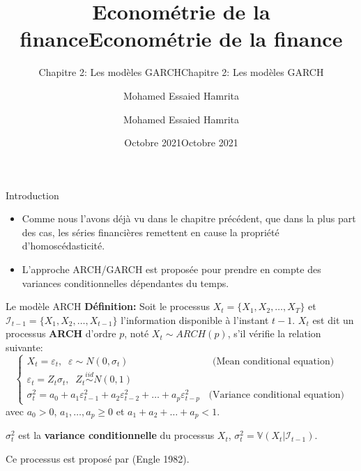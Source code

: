 \documentclass[
  ignorenonframetext,
]{beamer}
\title{Econométrie de la finance}
\subtitle{Chapitre 2: Les modèles GARCH}
\author{Mohamed Essaied Hamrita}
\date{Octobre 2021}
\title{Econométrie de la finance}
\subtitle{Chapitre 2: Les modèles GARCH}
\author{Mohamed Essaied Hamrita}
\date{Octobre 2021}
\begin{document}
\frame{\titlepage}

\begin{frame}
\end{frame}

\begin{frame}{Introduction}
\protect\hypertarget{introduction}{}
\begin{itemize}[<+->]
\item
  Comme nous l'avons déjà vu dans le chapitre précédent, que dans la
  plus part des cas, les séries financières remettent en cause la
  propriété d'homoscédasticité.
\item
  L'approche ARCH/GARCH est proposée pour prendre en compte des
  variances conditionnelles dépendantes du temps.
\end{itemize}
\end{frame}

\begin{frame}{Le modèle ARCH}
\protect\hypertarget{le-moduxe8le-arch}{}
\textbf{Définition:} Soit le processus \(X_t=\{X_1, X_2, \ldots, X_T\}\)
et \(\mathcal{I}_{t-1}=\{X_1, X_2, \ldots, X_{t-1}\}\) l'information
disponible à l'instant \(t-1\). \(X_t\) est dit un processus
\textbf{ARCH} d'ordre \(p\), noté \(X_t \sim ARCH(p)\), s'il vérifie la
relation suivante: \[
\begin{cases}
X_t=\varepsilon_t, \;\; \varepsilon \sim N(0,\sigma_t)\;\;\qquad\qquad\qquad\quad\;\:\: \text{ (Mean conditional equation)}\\
\varepsilon_t=Z_t\sigma_t,\;\; Z_t \stackrel{iid}\sim N(0,1)\\
\sigma^2_t=a_0 + a_1 \varepsilon^2_{t-1}+a_2 \varepsilon^2_{t-2} + \ldots +a_p \varepsilon^2_{t-p}\;\;\text{ (Variance conditional equation)}
\end{cases}
\] avec \(a_0 >0\), \(a_1,\ldots, a_p \geq 0\) et
\(a_1+a_2+\ldots + a_p<1\).

\(\sigma^2_t\) est la \textbf{variance conditionnelle} du processus
\(X_t\), \(\sigma^2_t=\mathbb{V}\left(X_t|\mathcal{I}_{t-1}\right)\).

Ce processus est proposé par (Engle 1982).
\end{frame}
\end{document}
